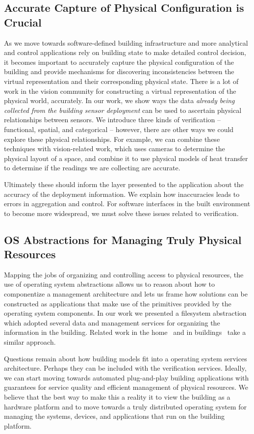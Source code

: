 \subsection{Accurate Capture of Physical Configuration is Crucial}
As we move towards software-defined building infrastructure and more analytical and control applications rely on building 
state to make detailed control decision, it becomes important to accurately capture the physical configuration of the building
and provide mechanisms for discovering inconsistencies between the virtual representation and their corresponding physical state.
There is a lot of work in the vision community for constructing a virtual representation of the physical world, accurately.
In our work, we show ways the data \emph{already being collected from the building sensor deployment} can be used to
ascertain physical relationships between sensors.  We introduce three kinds of verification -- functional, spatial, and categorical --
however, there are other ways we could explore these physical relationships.  For example, we can combine 
these techniques with vision-related work, which uses cameras to determine the physical layout of a space, and combine
it to use physical models of heat transfer to determine if the readings we are collecting are accurate.

Ultimately these should inform the layer presented to the application about the accuracy of the deployment information.  We
explain how inaccuracies leads to errors in aggregation and control.  For software interfaces in the built environment
to become more widespread, we must solve these issues related to verification.


\subsection{OS Abstractions for Managing Truly Physical Resources}
Mapping the jobs of organizing and controlling access to physical resources, the use of operating system abstractions
allows us to reason about how to componentize a management architecture and lets us frame how solutions can 
be constructed as applications that make use of the primitives provided by the operating system components.
In our work we presented a filesystem abstraction which adopted several data and management services for organizing
the information in the building.  Related work in the home~\cite{homeos} and in buildings~\cite{boss} take a similar
approach.

Questions remain about how building models fit into a operating system services architecture.  Perhaps they can be
included with the verification services.  Ideally, we can start moving towards automated plug-and-play building applications
with guarantees for service quality and efficient management of physical resources.  We believe that the best way to
make this a reality it to view the building as a hardware platform and to move towards a truly distributed operating system
for managing the systems, devices, and applications that run on the building platform.



